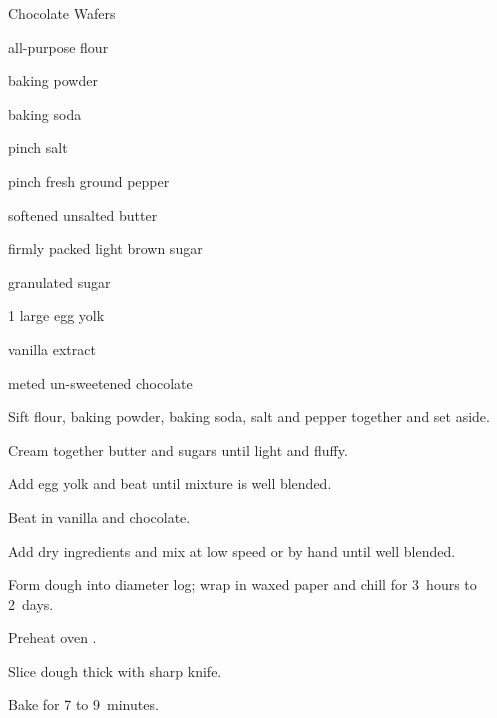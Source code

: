 \begin{recipe}{Chocolate Wafers}{}{}

\begin{ingredients}
\item {} all-purpose flour
\item \tp{\half} baking powder
\item \tp{\quarter} baking soda
\item pinch salt
\item pinch fresh ground pepper
\item \C{\threequarter} softened unsalted butter
\item \C{\quarter} firmly packed light brown sugar
\item \C{\quarter} granulated sugar
\item 1 large egg yolk
\item {} vanilla extract
\item \C{\eighth} meted un-sweetened chocolate
\end{ingredients}

\begin{directions}
\item Sift flour, baking powder, baking soda, salt and pepper together and set aside.
\item Cream together butter and sugars until light and fluffy.
\item Add egg yolk and beat until mixture is well blended.
\item Beat in vanilla and chocolate.
\item Add dry ingredients and mix at low speed or by hand until well blended.
\item Form dough into  diameter log; wrap in waxed paper and chill for 3~hours to 2~days.
\item Preheat oven .
\item Slice dough \cm{\quarter} thick with sharp knife.
\item Bake for 7 to 9~minutes.
\end{directions}

\end{recipe}
